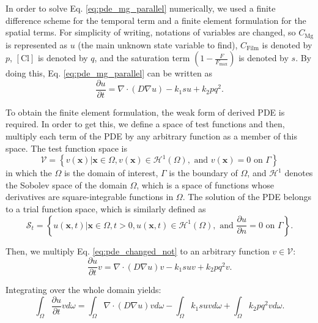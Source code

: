 In order to solve Eq. \ref{eq:pde_mg_parallel} numerically, we used a finite difference scheme for the temporal term and a finite element formulation for the spatial terms. For simplicity of writing, notations of variables are changed, so $C_\mathrm{Mg}$ is represented as $u$ (the main unknown state variable to find), $C_\mathrm{Film}$ is denoted by $p$, $[\mathrm{Cl}]$ is denoted by $q$, and the saturation term $(1-\frac{F}{F_{\max }})$ is denoted by $s$. By doing this, Eq. \ref{eq:pde_mg_parallel} can be written as
\begin{equation} \label{eq:pde_changed_not}
\frac{\partial u}{\partial t}=\nabla \cdot (D   \nabla u)-k_{1} s u+k_{2} p q^{2}.
\end{equation}

To obtain the finite element formulation, the weak form of derived {PDE} is required. In order to get this, we define a space of test functions and then, multiply each term of the {PDE} by any arbitrary function as a member of this space. The test function space is
\begin{equation} \label{eq:function_space}
\mathcal{V}=\left\{v(\mathbf{x}) | \mathbf{x} \in {\Omega}, v(\mathbf{x}) \in \mathcal{H}^{1}(\Omega), \text { and } v(\mathbf{x})=0 \text { on } \Gamma\right\}
\end{equation}
in which the $\Omega$ is the domain of interest, $\Gamma$ is the boundary of $\Omega$, and $\mathcal{H}^{1}$ denotes the Sobolev space of the domain $\Omega$, which is a space of functions whose derivatives are square-integrable functions in $\Omega$. The solution of the {PDE} belongs to a trial function space, which is similarly defined as
\begin{equation} \label{eq:trial_domain}
\mathcal{S}_{t}=\left\{u(\mathbf{x}, t) | \mathbf{x} \in \Omega, t>0, u(\mathbf{x}, t) \in \mathcal{H}^{1}(\Omega), \text { and } \frac{\partial u}{\partial n}=0 \text { on } \Gamma\right\}.
\end{equation}

Then, we multiply Eq. \ref{eq:pde_changed_not} to an arbitrary function $v \in \mathcal{V}$:
\begin{equation}
\frac{\partial u}{\partial t} v=\nabla \cdot (D  \nabla u) v-k_{1} s u v+k_{2} p q^{2} v.
\end{equation}

\noindent Integrating over the whole domain yields:
\begin{equation} \label{eq:int_first}
\int_{\Omega} \frac{\partial u}{\partial t} v d \omega=\int_{\Omega} \nabla \cdot (D  \nabla u) v d \omega-\int_{\Omega} k_{1} s u v d \omega+\int_{\Omega} k_{2} p q^{2} v d \omega.
\end{equation}

